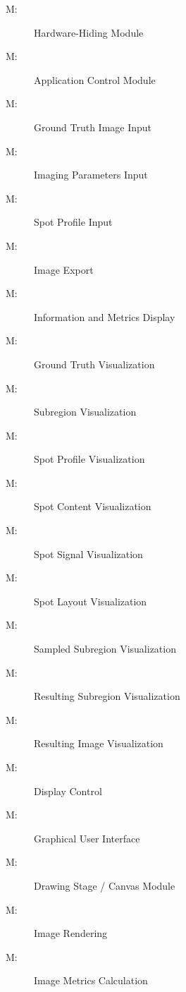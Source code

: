 \documentclass[12pt, titlepage]{article}
\newcounter{mnum}
\newcommand{\mthemnum}{M\themnum}
\begin{document}
\begin{description}
\item [ \mthemnum \label{M_HdwHide}:] Hardware-Hiding Module
\item [ \mthemnum \label{M_control}:] Application Control Module
\item [ \mthemnum \label{M_imgGTInput}:] Ground Truth Image Input
\item [ \mthemnum \label{M_params}:] Imaging Parameters Input
\item [ \mthemnum \label{M_inSpotProfile}:] Spot Profile Input
\item [ \mthemnum \label{M_export}:] Image Export
\item [ \mthemnum \label{M_infoDisp}:] Information and Metrics Display
\item [ \mthemnum \label{M_vizGT}:] Ground Truth Visualization
\item [ \mthemnum \label{M_vizSubregion}:] Subregion Visualization
\item [ \mthemnum \label{M_vizSpotProfile}:] Spot Profile Visualization
\item [ \mthemnum \label{M_vizSpotContent}:] Spot Content Visualization
\item [ \mthemnum \label{M_vizSpotSignal}:] Spot Signal Visualization
\item [ \mthemnum \label{M_vizSpotLayout}:] Spot Layout Visualization
\item [ \mthemnum \label{M_vizSampledSub}:] Sampled Subregion Visualization
\item [ \mthemnum \label{M_vizResultSub}:] Resulting Subregion Visualization
\item [ \mthemnum \label{M_vizResultImg}:] Resulting Image Visualization
\item [ \mthemnum \label{M_dispControl}:] Display Control
\item [ \mthemnum \label{M_GUI}:] Graphical User Interface
\item [ \mthemnum \label{M_drawStage}:] Drawing Stage / Canvas Module
\item [ \mthemnum \label{M_rendering}:] Image Rendering
\item [ \mthemnum \label{M_metric}:] Image Metrics Calculation
\end{description}
\end{document}
